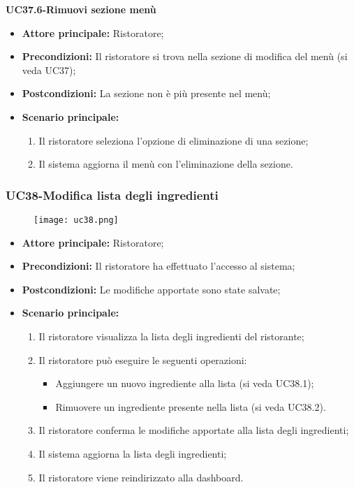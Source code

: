 \textbf{UC37.6-Rimuovi sezione menù}
\begin{itemize}
    \item \textbf{Attore principale:} Ristoratore;
    \item \textbf{Precondizioni:} Il ristoratore si trova nella sezione di modifica del menù (si veda UC37);
    \item \textbf{Postcondizioni:} La sezione non è più presente nel menù;
    \item \textbf{Scenario principale:}
    \begin{enumerate}
        \item Il ristoratore seleziona l'opzione di eliminazione di una sezione;
        \item Il sistema aggiorna il menù con l'eliminazione della sezione.
    \end{enumerate}
\end{itemize}

\subsubsection{UC38-Modifica lista degli ingredienti}
\begin{figure}[h] \texttt{[image: uc38.png]} \end{figure}
\begin{itemize}
    \item \textbf{Attore principale:} Ristoratore;
    \item \textbf{Precondizioni:} Il ristoratore ha effettuato l'accesso al sistema;
    \item \textbf{Postcondizioni:} Le modifiche apportate sono state salvate;
    \item \textbf{Scenario principale:}
    \begin{enumerate}
        \item Il ristoratore visualizza la lista degli ingredienti del ristorante;
        \item Il ristoratore può eseguire le seguenti operazioni:
        \begin{itemize}
           \item Aggiungere un nuovo ingrediente alla lista (si veda UC38.1);
           \item Rimuovere un ingrediente presente nella lista (si veda UC38.2).
        \end{itemize}
    \item Il ristoratore conferma le modifiche apportate alla lista degli ingredienti;
    \item Il sistema aggiorna la lista degli ingredienti;
    \item Il ristoratore viene reindirizzato alla dashboard.
    \end{enumerate}
\end{itemize}

